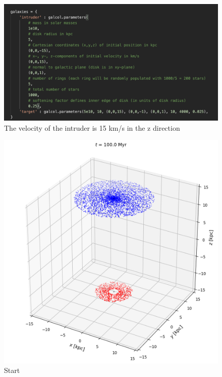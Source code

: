 \documentclass[linenumbers,RNAAS,trackchanges]{aastex631}
\begin{document}
\begin{figure}[H]
    \centering
    \includegraphics[scale=.70]{cartwheel_input_vars.png}
    \caption{The velocity of the intruder is 15 km/s in the z direction}
    \label{fig:code}
\end{figure}
\newpage
\begin{figure}[H]
    \centering
    \includegraphics[scale=.40]{cartwheel_input.png}
    \caption{Start}
    \label{fig:code}
\end{figure}
\end{document}
